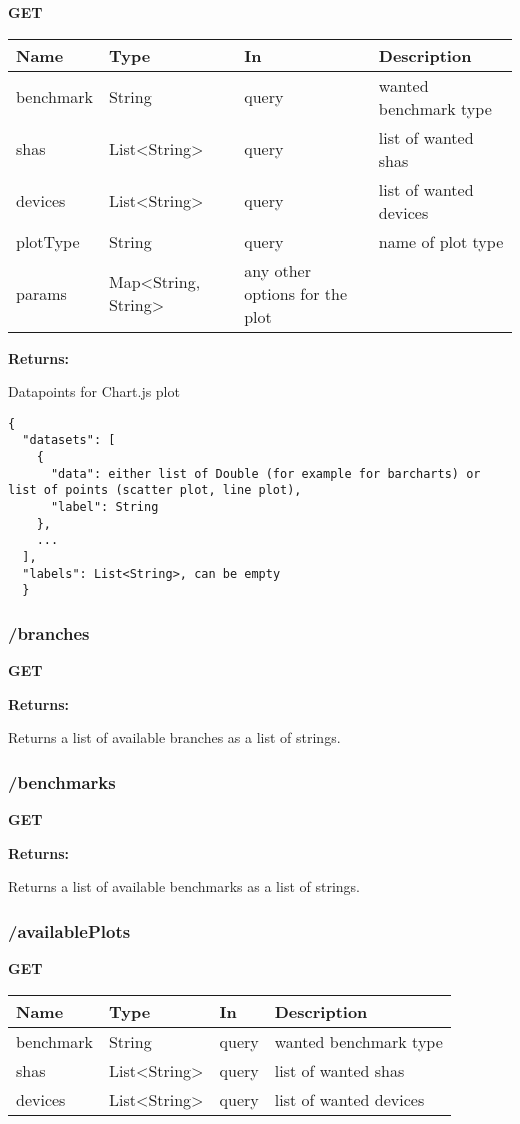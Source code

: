\textbf{GET}

\begin{tabular}{ l l l l }
  Name & Type & In & Description \\ 
  \hline
  benchmark & String & query & wanted benchmark type \\
  shas & List<String> & query & list of wanted shas \\
  devices & List<String> & query & list of wanted devices \\
  plotType & String & query & name of plot type \\
  params & Map<String, String> & any other options for the plot \\
  \hline
\end{tabular}

\textbf{Returns: }

Datapoints for Chart.js plot
\begin{lstlisting}
{
  "datasets": [
    {
      "data": either list of Double (for example for barcharts) or list of points (scatter plot, line plot),
      "label": String
    },
    ...
  ],
  "labels": List<String>, can be empty
  }
\end{lstlisting}

\subsubsection*{/branches}

\textbf{GET}

\textbf{Returns: }

Returns a list of available branches as a list of strings.

\subsubsection*{/benchmarks}

\textbf{GET}

\textbf{Returns: }

Returns a list of available benchmarks as a list of strings.

\subsubsection*{/availablePlots}

\textbf{GET}

\begin{tabular}{ l l l l }
  Name & Type & In & Description \\ 
  \hline
  benchmark & String & query & wanted benchmark type \\
  shas & List<String> & query & list of wanted shas \\
  devices & List<String> & query & list of wanted devices \\
  \hline
\end{tabular}


